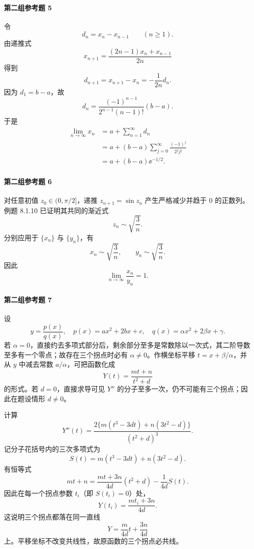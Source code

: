 \paragraph{第二组参考题 5}
\begin{xsolution}
令
\[
  d_n=x_n-x_{n-1}\qquad(n\ge1).
\]
由递推式
\[
  x_{n+1}=\frac{(2n-1)x_n+x_{n-1}}{2n}
\]
得到
\[
  d_{n+1}=x_{n+1}-x_n=-\frac1{2n}d_n.
\]
因为 $d_1=b-a$，故
\[
  d_n=\frac{(-1)^{n-1}}{2^{n-1}(n-1)!}(b-a).
\]
于是
\begin{align*}
  \lim_{n\to\infty}x_n
  &=a+\sum_{n=1}^\infty d_n\\
  &=a+(b-a)\sum_{j=0}^\infty\frac{(-1)^j}{2^j j!}\\
  &=\boxed{a+(b-a)\ee^{-1/2}}.
\end{align*}
\end{xsolution}

\paragraph{第二组参考题 6}
\begin{xsolution}
对任意初值 $z_0\in(0,\pi/2]$，递推 $z_{n+1}=\sin z_n$ 产生严格减少并趋于 0 的正数列。例题 8.1.10 已证明其共同的渐近式
\[
  z_n\sim\sqrt{\frac3n}.
\]
分别应用于 $\{x_n\}$ 与 $\{y_n\}$，有
\[
  x_n\sim\sqrt{\frac3n},
  \qquad
  y_n\sim\sqrt{\frac3n}.
\]
因此
\[
  \boxed{\lim_{n\to\infty}\frac{x_n}{y_n}=1}.
\]
\end{xsolution}

\paragraph{第二组参考题 7}
\begin{xsolution}
设
\[
  y=\frac{p(x)}{q(x)},
  \quad
  p(x)=ax^2+2bx+c,
  \quad
  q(x)=\alpha x^2+2\beta x+\gamma.
\]
若 $\alpha=0$，直接约去多项式部分后，剩余部分至多是常数除以一次式，其二阶导数至多有一个零点；故存在三个拐点时必有 $\alpha\ne0$。作横坐标平移 $t=x+\beta/\alpha$，并从 $y$ 中减去常数 $a/\alpha$，可把函数化成
\[
  Y(t)=\frac{mt+n}{t^2+d}
\]
的形式。若 $d=0$，直接求导可见 $Y''$ 的分子至多一次，仍不可能有三个拐点；因此在题设情形 $d\ne0$。

计算
\[
  Y''(t)=
  \frac{2\{m(t^3-3dt)+n(3t^2-d)\}}{(t^2+d)^3}.
\]
记分子花括号内的三次多项式为
\[
  S(t)=m(t^3-3dt)+n(3t^2-d).
\]
有恒等式
\[
  mt+n
  =\frac{mt+3n}{4d}(t^2+d)-\frac1{4d}S(t).
\]
因此在每一个拐点参数 $t_i$（即 $S(t_i)=0$）处，
\[
  Y(t_i)=\frac{mt_i+3n}{4d}.
\]
这说明三个拐点都落在同一直线
\[
  Y=\frac{m}{4d}t+\frac{3n}{4d}
\]
上。平移坐标不改变共线性，故原函数的三个拐点必共线。
\end{xsolution}

